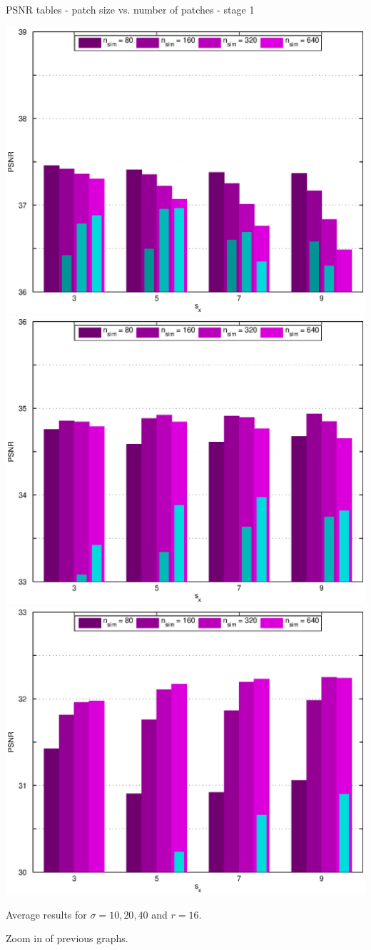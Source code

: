 \documentclass[mathserif, 8pt]{beamer}
\begin{document}
\begin{frame}{PSNR tables - patch size vs. number of patches - stage 1}
	\begin{center}
		\includegraphics[width=.33\textwidth]{zoom_psnr_px1-np1-bars_1r16_s10_average.eps}%
		\includegraphics[width=.33\textwidth]{zoom_psnr_px1-np1-bars_1r16_s20_average.eps}%
		\includegraphics[width=.33\textwidth]{zoom_psnr_px1-np1-bars_1r16_s40_average.eps}
	\end{center}
	\begin{center}
	Average results for $\sigma = 10, 20, 40$ and $r = 16$. 
	\bigskip
	
	Zoom in of previous graphs.
	\end{center}
\end{frame}
\end{document}
